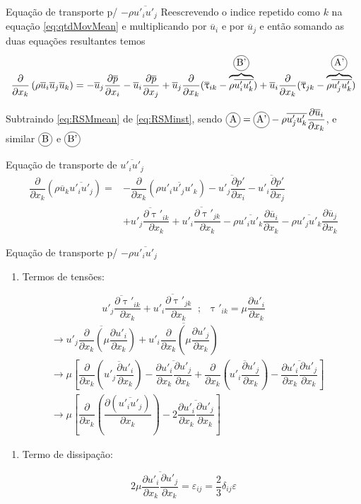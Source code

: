 \documentclass[10pt]{beamer}
\newcommand{\ddx}[2]{\dfrac{\partial #1}{\partial x_{#2}}}
\newcommand{\ddxp}[2]{\dfrac{\partial }{\partial x_{#2}}\left(#1\right)}
\newcommand{\m}[1]{\overline{#1}}
\newcommand{\incircle}[1]{{\tikz[baseline=(X.base)] \node(X)[draw, shape=circle, inner sep=0]{\strut #1};}}
\begin{document}
\begin{frame}{Equação de transporte p/ $ -\rho \m{u'_i u'_j} $}
	Reescrevendo o indice repetido como $k$ na equação \ref{eq:qtdMovMean} e multiplicando por $ \m{u}_i $ e por $ \m{u}_j $ e então somando as duas equações resultantes temos
	\begin{equation}\label{eq:RSMmean}
	\ddxp{\rho \m{u}_i \m{u}_j \m{u}_k}{k} = - \m{u}_j \ddx{\m{p}}{i} - \m{u}_i \ddx{\m{p}}{j} + \m{u}_j \ddx{}{k}(\m{\uptau}_{ik} - \overbrace{\rho\m{u'_iu'_k}}^{\incircle{B'}}) + \m{u}_i \ddx{}{k}(\m{\uptau}_{jk} - \overbrace{\rho\m{u'_ju'_k}}^{\incircle{A'}})
	\end{equation}
	
	Subtraindo \ref{eq:RSMmean} de \ref{eq:RSMinst}, sendo $\incircle{A} = \incircle{A'} - \rho \m{u'_ju'_k}\ddx{\m{u}_i}{k}$, e similar $\incircle{B} $ e $ \incircle{B'} $
	
	\begin{block}{Equação de transporte de $ \m{u'_i u'_j} $}
		\begin{align}\label{eq:uiuj}
	\ddxp{\rho \m{u}_k \m{u'_i u'_j}}{k} = &- \ddxp{\rho \m{u'_iu'_ju'_k}}{k} - \m{u'_j\ddx{p'}{i}} - \m{u'_i\ddx{p'}{j}} \nonumber \\
	&+ \m{u'_j\ddx{\uptau'_{ik}}{k}} + \m{u'_i\ddx{\uptau'_{jk}}{k}}
	- \rho \m{u'_i u'_k} \ddx{\m{u}_i}{k} - \rho \m{u'_j u'_k} \ddx{\m{u}_j}{k} 
	\end{align}
	\end{block}
		
\end{frame}

\begin{frame}{Equação de transporte p/ $ -\rho \m{u'_i u'_j} $}
	
	\begin{enumerate}[$\bullet$]
		\item Termos de tensões:
	\end{enumerate}
	
	\begin{equation*}
	\m{u'_j\ddx{\uptau'_{ik}}{k}} + \m{u'_i\ddx{\uptau'_{jk}}{k}} \;\;;\;\; \uptau'_{ik} = \mu \ddx{u'_i}{k}
	\end{equation*}
	\begin{align*}
	&\rightarrow \m{u'_j\ddxp{\mu \ddx{u'_i}{k}}{k}} + \m{u'_i\ddxp{\mu \ddx{u'_j}{k}}{k}} \\
	&\rightarrow \mu \left[ \ddxp{\m{u'_j \ddx{u'_i}{k}}}{k} - \m{\ddx{u'_i}{k}\ddx{u'_j}{k}} + \ddxp{\m{u'_i \ddx{u'_j}{k}}}{k} - \m{\ddx{u'_i}{k}\ddx{u'_j}{k}} \right] \\
	&\rightarrow \mu \left[ \ddxp{\ddx{(\m{u'_iu'_j})}{k}}{k} - 2 \m{\ddx{u'_i}{k}\ddx{u'_j}{k}} \right]
	\end{align*}
	
	\begin{enumerate}[$\bullet$]
		\item Termo de dissipação:
	\end{enumerate}
	\begin{equation*}
	2 \mu \m{\ddx{u'_i}{k}\ddx{u'_j}{k}} = \varepsilon_{ij} = \dfrac{2}{3} \delta_{ij}\varepsilon
	\end{equation*}
	
	
\end{frame}
\end{document}
